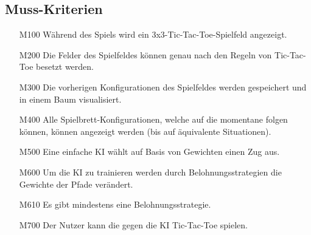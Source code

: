 \documentclass[titlepage]{scrartcl}
\begin{document}
\subsection{Muss-Kriterien}
	\begin{itemize}
		\item[M100] Während des Spiels wird ein 3x3-Tic-Tac-Toe-Spielfeld angezeigt.
		\item[M200] Die Felder des Spielfeldes können genau nach den Regeln von Tic-Tac-Toe besetzt werden.
		\item[M300] Die vorherigen Konfigurationen des Spielfeldes werden gespeichert und in einem Baum visualisiert.
		\item[M400] Alle Spielbrett-Konfigurationen, welche auf die momentane folgen können, können angezeigt werden (bis auf äquivalente Situationen).
		\item[M500] Eine einfache KI wählt auf Basis von Gewichten einen Zug aus.
		\item[M600] Um die KI zu trainieren werden durch Belohnungsstrategien die Gewichte der Pfade verändert.
		\item[M610] Es gibt mindestens eine Belohnungsstrategie.
		\item[M700] Der Nutzer kann die gegen die KI Tic-Tac-Toe spielen.
	\end{itemize}
\end{document}
